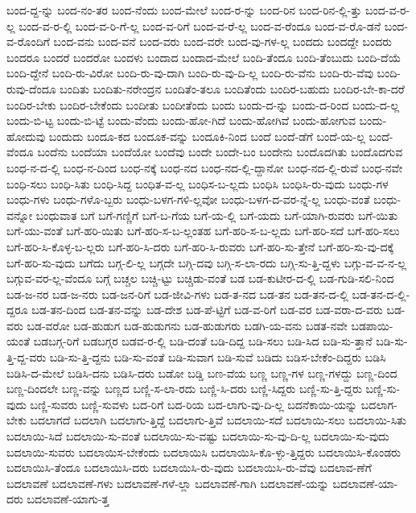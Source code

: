 {ಬಂದ-ದ್ದ-ನ್ನು
ಬಂದ-ನಂ-ತರ
ಬಂದ-ನೆಂದು
ಬಂದ-ಮೇಲೆ
ಬಂದ-ರ-ನ್ನು
ಬಂದ-ರಿನ
ಬಂದ-ರಿನ-ಲ್ಲಿ-ತ್ತು
ಬಂದ-ವ-ರ-ಲ್ಲ
ಬಂದ-ವ-ರ-ಲ್ಲಿ
ಬಂದ-ವ-ರಿ-ಗೆ-ಲ್ಲ
ಬಂದ-ವ-ರಿಗೆ
ಬಂದ-ವ-ರೆ-ಲ್ಲ
ಬಂದ-ವ-ರೆಂದೂ
ಬಂದ-ವ-ರೊ-ಡನೆ
ಬಂದ-ವ-ರೊಂದಿಗೆ
ಬಂದ-ವನು
ಬಂದ-ವನೆ
ಬಂದ-ವರು
ಬಂದ-ವರೇ
ಬಂದ-ವು-ಗಳ-ಲ್ಲ
ಬಂದದು
ಬಂದದ್ದೇ
ಬಂದರು
ಬಂದರೂ
ಬಂದರೆ
ಬಂದರೋ
ಬಂದಳು
ಬಂದಾದ
ಬಂದಾದ-ಮೇಲೆ
ಬಂದಿ-ತೆಂದೂ
ಬಂದಿ-ತೆಂಬುದು
ಬಂದಿ-ದೆಯೆ
ಬಂದಿ-ದ್ದೇನೆ
ಬಂದಿ-ರು-ವಿರೋ
ಬಂದಿ-ರು-ವು-ದಾಗಿ
ಬಂದಿ-ರು-ವು-ದಿ-ಲ್ಲ
ಬಂದಿ-ರು-ವೆನು
ಬಂದಿ-ರು-ವೆವು
ಬಂದಿ-ರುವು-ದೆಂದೂ
ಬಂದಿತು
ಬಂದಿತು-ನರೇಂದ್ರನ
ಬಂದಿತೆಂ-ತಲೂ
ಬಂದಿತೆಂದು
ಬಂದಿರ-ಬಹುದು
ಬಂದಿರ-ಬೇ-ಕಾ-ದರೆ
ಬಂದಿರ-ಬೇಕು
ಬಂದಿರ-ಬೇಕೆಂದು
ಬಂದೀತು
ಬಂದೀತೆಂದು
ಬಂದು
ಬಂದು-ದ-ನ್ನು
ಬಂದು-ದ-ರಿಂದ
ಬಂದು-ದ-ಲ್ಲ
ಬಂದು-ಬಿ-ಟ್ಟ
ಬಂದು-ಬಿ-ಟ್ಟೆ
ಬಂದು-ವೆಂದು
ಬಂದು-ಹೋ-ಗಿದೆ
ಬಂದು-ಹೋಗಿವೆ
ಬಂದು-ಹೋಗುವ
ಬಂದು-ಹೋದುವು
ಬಂದುದು
ಬಂದೂ-ಕದ
ಬಂದೂಕ-ವನ್ನು
ಬಂದೂಕಿ-ನಿಂದ
ಬಂದೆ
ಬಂದೆ-ಡೆಗೆ
ಬಂದೆ-ಯ-ಲ್ಲ
ಬಂದೆ-ವೆಂದೂ
ಬಂದೆನು
ಬಂದೆಯಾ
ಬಂದೆಯೋ
ಬಂದೆವು
ಬಂದೇ
ಬಂದೇ-ಬಂ
ಬಂದೇನು
ಬಂದೊದಗಿತು
ಬಂದೊದಗುವ
ಬಂಧ-ನ-ದ-ಲ್ಲಿ
ಬಂಧ-ನ-ದಿಂದ
ಬಂಧ-ನಕ್ಕೆ
ಬಂಧ-ನದ
ಬಂಧ-ನದ-ಲ್ಲಿ-ದ್ದಾನೋ
ಬಂಧ-ನದ-ಲ್ಲಿ-ರುವೆ
ಬಂಧ-ನವೇ
ಬಂಧಿ-ಸಲು
ಬಂಧಿ-ಸಿತು
ಬಂಧಿ-ಸಿದ್ದ
ಬಂಧಿತ-ವ-ಲ್ಲ
ಬಂಧಿಸ-ಬ-ಲ್ಲದು
ಬಂಧಿಸಿ
ಬಂಧಿಸಿ-ರು-ವುದು
ಬಂಧು-ಗಳ
ಬಂಧು-ಗಳು
ಬಂಧು-ಗಳೊ-ಬ್ಬರು
ಬಂಧು-ಬಳಗ-ಗಳಿ-ಲ್ಲವೋ
ಬಂಧು-ಬಳಗ-ದ-ವರ-ನ್ನೆ-ಲ್ಲ
ಬಂಧು-ವಂತೆ
ಬಂಧು-ವನ್ನೋ
ಬಂಧುವಾತ
ಬಗೆ
ಬಗೆ-ಗಣ್ಣಿಗೆ
ಬಗೆ-ಬ-ಗೆಯ
ಬಗೆ-ಯ-ಲ್ಲಿ
ಬಗೆ-ಯದು
ಬಗೆ-ಯಾಗಿ-ರುವರು
ಬಗೆ-ಯಿತು
ಬಗೆ-ಯು-ವಂತೆ
ಬಗೆ-ಹರಿ-ಯಿತು
ಬಗೆ-ಹರಿ-ಸ-ಬ-ಲ್ಲಂತಹ
ಬಗೆ-ಹರಿ-ಸ-ಬ-ಲ್ಲದು
ಬಗೆ-ಹರಿ-ಸದೆ
ಬಗೆ-ಹರಿ-ಸಲು
ಬಗೆ-ಹರಿ-ಸಿ-ಕೊಳ್ಳ-ಬ-ಲ್ಲರು
ಬಗೆ-ಹರಿ-ಸಿ-ದರು
ಬಗೆ-ಹರಿ-ಸಿ-ರುವರು
ಬಗೆ-ಹರಿ-ಸು-ತ್ತೇನೆ
ಬಗೆ-ಹರಿ-ಸು-ವು-ದಕ್ಕೆ
ಬಗೆ-ಹರಿ-ಸು-ವುದು
ಬಗೆದು
ಬಗ್ಗ-ಲಿ-ಲ್ಲ
ಬಗ್ಗದೇ
ಬಗ್ಗಿ-ದವು
ಬಗ್ಗಿ-ಸ-ಲಾ-ರದು
ಬಗ್ಗಿ-ಸು-ತ್ತಿ-ದ್ದಳು
ಬಗ್ಗು-ವ-ವ-ನ-ಲ್ಲ
ಬಗ್ಗುವ-ವರ-ಲ್ಲ-ವೆಂದೂ
ಬಗ್ಗೆ
ಬಚ್ಚಲ
ಬಚ್ಚಿ-ಟ್ಟು
ಬಚ್ಚಿಡು-ವಂತೆ
ಬಡ
ಬಡ-ಕುಟೀರ-ದ-ಲ್ಲಿ
ಬಡ-ಗುಡಿ-ಸಲಿ-ನಿಂದ
ಬಡ-ಜ-ನರ
ಬಡ-ಜ-ನರು
ಬಡ-ಜನ-ರಿಗೆ
ಬಡ-ಜೀವಿ-ಗಳು
ಬಡ-ತ-ನದ
ಬಡ-ತನ
ಬಡ-ತನ-ದ-ಲ್ಲಿ
ಬಡ-ತನ-ದ-ಲ್ಲಿ-ದ್ದರೂ
ಬಡ-ತನ-ದಿಂದ
ಬಡ-ತನ-ವನ್ನು
ಬಡ-ದೇಶ
ಬಡ-ಪೆ-ಟ್ಟಿಗೆ
ಬಡ-ವ-ರಿಗೆ
ಬಡ-ವರ
ಬಡ-ವರಾ-ದ-ವರು
ಬಡ-ವರು
ಬಡ-ವರೋ
ಬಡ-ಹುಡುಗ
ಬಡ-ಹುಡುಗನು
ಬಡ-ಹುಡುಗರು
ಬಡಗಿ-ಯ-ವನು
ಬಡತ-ನವೇ
ಬಡಪಾಯಿ-ಯಂತೆ
ಬಡಬಗ್ಗ-ರಿಗೆ
ಬಡಬಗ್ಗರ
ಬಡವ-ರ-ಲ್ಲಿ
ಬಡಿ-ದಂತೆ
ಬಡಿ-ದಿದ್ದ
ಬಡಿ-ಸಲು
ಬಡಿ-ಸಿದ
ಬಡಿ-ಸು-ತ್ತಾನೆ
ಬಡಿ-ಸು-ತ್ತಿ-ದ್ದ-ವರು
ಬಡಿ-ಸು-ತ್ತಿ-ದ್ದನು
ಬಡಿ-ಸು-ವಂತೆ
ಬಡಿ-ಸುವಾಗ
ಬಡಿ-ಸುವೆ
ಬಡಿದು
ಬಡಿಸ-ಬೇಕೆಂ-ದಿದ್ದರು
ಬಡಿಸಿ
ಬಡಿಸಿ-ದ-ಮೇಲೆ
ಬಡಿಸಿ-ದನು
ಬಡಿಸಿ-ದರು
ಬಡೋ
ಬಡ್ಡಿ
ಬಣ-ವೆಯ
ಬಣ್ಣ
ಬಣ್ಣ-ಗಳ
ಬಣ್ಣ-ಗಳದ್ದು
ಬಣ್ಣ-ದಿಂದ
ಬಣ್ಣ-ದಿಂದಲೇ
ಬಣ್ಣ-ವನ್ನು
ಬಣ್ಣದ
ಬಣ್ಣಿ-ಸ-ಲಾ-ರದು
ಬಣ್ಣಿ-ಸಿ-ದರು
ಬಣ್ಣಿ-ಸಿದ್ದರು
ಬಣ್ಣಿ-ಸು-ತ್ತಿ-ದ್ದರು
ಬಣ್ಣಿ-ಸು-ವುದು
ಬಣ್ಣಿ-ಸುವರು
ಬಣ್ಣಿ-ಸುವಳು
ಬದ-ರಿಗೆ
ಬದ-ರಿಯ
ಬದ-ಲಾಗು-ವು-ದಿ-ಲ್ಲ
ಬದನೆಕಾಯಿ-ಯನ್ನು
ಬದಲಾಗ-ಬೇಕು
ಬದಲಾಗದೆ
ಬದಲಾಗಿ
ಬದಲಾಗು-ತ್ತಿದ್ದೆ
ಬದಲಾಗು-ತ್ತಿವೆ
ಬದಲಾಯಿ-ಸದೆ
ಬದಲಾಯಿ-ಸಲು
ಬದಲಾಯಿ-ಸಿತು
ಬದಲಾಯಿ-ಸಿದೆ
ಬದಲಾಯಿ-ಸು-ವಂತೆ
ಬದಲಾಯಿ-ಸು-ವಷ್ಟು
ಬದಲಾಯಿ-ಸು-ವು-ದಿ-ಲ್ಲ
ಬದಲಾಯಿ-ಸು-ವುದು
ಬದಲಾಯಿ-ಸುವರು
ಬದಲಾಯಿಸ-ಬೇಕೆಂದು
ಬದಲಾಯಿಸಿ
ಬದಲಾಯಿಸಿ-ಕೊ-ಳ್ಳು-ತ್ತಿದ್ದರು
ಬದಲಾಯಿಸಿ-ಕೊಂಡರು
ಬದಲಾಯಿಸಿ-ತೆಂದೂ
ಬದಲಾಯಿಸಿ-ದರು
ಬದಲಾಯಿಸಿ-ರು-ವುದು
ಬದಲಾಯಿಸಿ-ರು-ವೆವು
ಬದಲಾವ-ಣೆಗೆ
ಬದಲಾವಣೆ
ಬದಲಾವಣೆ-ಗಳು
ಬದಲಾವಣೆ-ಗಳೆ-ಲ್ಲಾ
ಬದಲಾವಣೆ-ಗಾಗಿ
ಬದಲಾವಣೆ-ಯನ್ನು
ಬದಲಾವಣೆ-ಯಾ-ದರು
ಬದಲಾವಣೆ-ಯಾಗು-ತ್ತ
}
